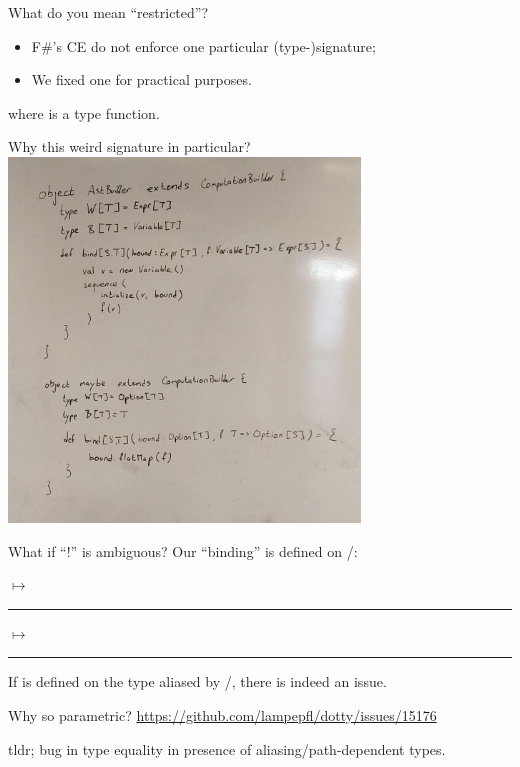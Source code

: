 \documentclass{beamer}
\newcommand{\translation}[2][0.5]{%
    \begin{minipage}[t]{#1\textwidth - 0.05\textwidth}%
    \end{minipage}%
    \hfill{}$\longmapsto$\hfill{}%
    \begin{minipage}[t]{0.95\textwidth - #1\textwidth}%
    \end{minipage}
    \rule{\textwidth}{0.4pt}
}
\begin{document}
    \begin{frame}{What do you mean ``restricted''?}
        \begin{itemize}
            \item F\#'s CE do not enforce one particular (type-)signature;
            \item We fixed one for practical purposes.
        \end{itemize}
        where  is a type function.
    \end{frame}

    \begin{frame}{Why this weird signature in particular?}
        \includegraphics[width=0.7\textwidth]{figs/reasoning.jpeg}
    \end{frame}

    \begin{frame}{What if ``!'' is ambiguous?}
        Our ``binding'' \scalasnippet{!} is defined on /:

        \translation{code/implicit/int}

        \translation{code/implicit/bool}

        If \scalasnippet{!} is defined on the type aliased by /, there is indeed an issue.
    \end{frame}

    \begin{frame}{Why so parametric?}
        \url{https://github.com/lampepfl/dotty/issues/15176}

        tldr; bug in type equality in presence of aliasing/path-dependent types.
    \end{frame}
\end{document}
